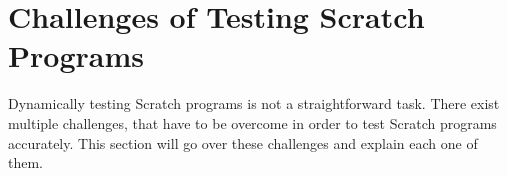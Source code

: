 %
%
%

\section{Challenges of Testing Scratch Programs}
\label{sec:challenges_of_testing_scratch_programs}

Dynamically testing Scratch programs is not a straightforward task.
There exist multiple challenges, that have to be overcome in order to test Scratch programs accurately.
This section will go over these challenges and explain each one of them.
\parspace

